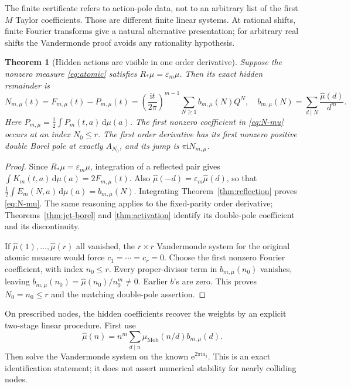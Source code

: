 \documentclass[11pt,a4paper]{article}
\numberwithin{equation}{section}
\newtheorem{theorem}{Theorem}[section]
\theoremstyle{definition}\newtheorem{definition}[theorem]{Definition}
\theoremstyle{remark}\newtheorem{remark}[theorem]{Remark}
\newcommand{\ii}{\mathrm i}\newcommand{\e}{\mathrm e}
\newcommand{\dd}{\,\mathrm d}\newcommand{\Li}{\operatorname{Li}}
\newcommand{\eps}{\varepsilon}\newcommand{\muh}{\widehat\mu}
\begin{document}
The finite certificate refers to action-pole data, not to an arbitrary
list of the first $M$ Taylor coefficients. Those are different finite
linear systems. At rational shifts, finite Fourier transforms give a
natural alternative presentation; for arbitrary real shifts the
Vandermonde proof avoids any rationality hypothesis.

\begin{theorem}[Hidden actions are visible in one order derivative]
\label{thm:action-detection}
Suppose the nonzero measure \eqref{eq:atomic} satisfies
$R_*\mu=\eps_m\mu$. Then its exact hidden remainder is
\begin{equation}
 N_{m,\mu}(t)=F_{m,\mu}(t)-P_{m,\mu}(t)
 =\left(\frac{\ii t}{2\pi}\right)^{m-1}
       \sum_{N\ge1}b_{m,\mu}(N)Q^N,
 \quad b_{m,\mu}(N)=\sum_{d\mid N}\frac{\muh(d)}{d^m}.
 \label{eq:N-mu}
\end{equation}
Here $P_{m,\mu}=\tfrac12\int P_m(t,a)\dd\mu(a)$.
The first nonzero coefficient in \eqref{eq:N-mu} occurs at an index
$N_0\le r$. The first order derivative has its first nonzero positive
double Borel pole at exactly $A_{N_0}$, and its jump is
$\pi\ii N_{m,\mu}$.
\end{theorem}
\begin{proof}
Since $R_*\mu=\eps_m\mu$, integration of a reflected pair gives
$\int K_m(t,a)\dd\mu(a)=2F_{m,\mu}(t)$. Also
$\muh(-d)=\eps_m\muh(d)$, so that
$\tfrac12\int E_m(N,a)\dd\mu(a)=b_{m,\mu}(N)$.
Integrating Theorem~\ref{thm:reflection} proves \eqref{eq:N-mu}.
The same reasoning applies to the fixed-parity order derivative;
Theorems~\ref{thm:jet-borel} and \ref{thm:activation} identify its
double-pole coefficient and its discontinuity.

If $\muh(1),\ldots,\muh(r)$ all vanished, the $r\times r$
Vandermonde system for the original atomic measure would force
$c_1=\cdots=c_r=0$. Choose the first nonzero Fourier coefficient,
with index $n_0\le r$. Every proper-divisor term in
$b_{m,\mu}(n_0)$ vanishes, leaving
$b_{m,\mu}(n_0)=\muh(n_0)/n_0^m\ne0$. Earlier $b$'s are zero.
This proves $N_0=n_0\le r$ and the matching double-pole assertion.
\end{proof}

On prescribed nodes, the hidden coefficients recover the weights by
an explicit two-stage linear procedure. First use
\begin{equation}
 \muh(n)=n^m\sum_{d\mid n}\mu_{\mathrm{Mob}}(n/d)b_{m,\mu}(d).
 \label{eq:recover-muh}
\end{equation}
Then solve the Vandermonde system on the known $\e^{2\pi\ii a_j}$.
This is an exact identification statement; it does not assert numerical
stability for nearly colliding nodes.
\end{document}
